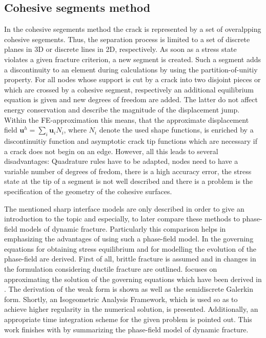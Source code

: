 \subsection{Cohesive segments method} \label{sec:intro_cohes}
In the cohesive segements method the crack is represented by a set of overalpping cohesive segements. Thus, the separation process is limited to a set of discrete planes in 3D or discrete lines in 2D, respectively. As soon as a stress state violates a given fracture criterion, a new segment is created. Such a segment adds a discontinuity to an element during calculations by using the partition-of-unitiy property. For all nodes whose support is cut by a crack into two disjoint pieces or which are crossed by a cohesive segment, respectively an additional equilibrium equation is given and new degrees of freedom are added. The latter do not affect energy conservation and describe the magnitude of the displacement jump. Within the FE-approximation this means, that the approximate displacement field $\mathbf{u}^{h}=\sum_{i}\mathbf{u}_{i}N_{i}$, where $N_{i}$ denote the used shape functions, is enriched by a discontinuitiy function and asymptotic crack tip functions which are necessary if a crack does not begin on an edge. However, all this leads to several disadvantages: Quadrature rules have to be adapted, nodes need to have a variable number of degrees of fredom, there is a high accuracy error, the stress state at the tip of a segment is not well described and there is a problem is the specification of the geometry of the cohesive surfaces. \cite{02_SotA_cohes}\cite{01_SotA_cohes_dyn}

The mentioned sharp interface models are only described in order to give an introduction to the topic and especially, to later compare these methods to phase-field models of dynamic fracture. Particularly this comparison helps in emphasizing the advantages of using such a phase-field model. In  the governing equations for obtaining stress equilibrium and for modelling the evolution of the phase-field are derived. First of all, brittle fracture is assumed and in  changes in the formulation considering ductile fracture are outlined.  focuses on approximating the solution of the governing equations which have been derived in . The derivation of the weak form is shown as well as the semidiscrete Galerkin form. Shortly, an Isogeometric Analysis Framework, which is used so as to achieve higher regularity in the numerical solution, is presented. Additionally, an appropriate time integration scheme for the given problem is pointed out. This work finishes with  by summarizing the phase-field model of dynamic fracture.




